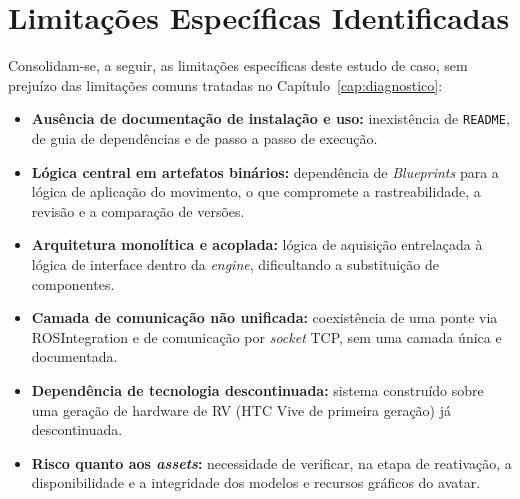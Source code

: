 \section{Limitações Específicas Identificadas}
\label{sec:vr-limitacoes}

Consolidam-se, a seguir, as limitações específicas deste estudo de caso, sem prejuízo das
limitações comuns tratadas no Capítulo~\ref{cap:diagnostico}:

\begin{itemize}
	\item \textbf{Ausência de documentação de instalação e uso:} inexistência de
	      \texttt{README}, de guia de dependências e de passo a passo de execução.
	\item \textbf{Lógica central em artefatos binários:} dependência de \emph{Blueprints}
	      para a lógica de aplicação do movimento, o que compromete a rastreabilidade, a
	      revisão e a comparação de versões.
	\item \textbf{Arquitetura monolítica e acoplada:} lógica de aquisição entrelaçada à
	      lógica de interface dentro da \emph{engine}, dificultando a substituição de
	      componentes.
	\item \textbf{Camada de comunicação não unificada:} coexistência de uma ponte via
	      ROSIntegration e de comunicação por \emph{socket} TCP, sem uma camada única e
	      documentada.
	\item \textbf{Dependência de tecnologia descontinuada:} sistema construído sobre uma
	      geração de hardware de RV (HTC Vive de primeira geração) já descontinuada.
	\item \textbf{Risco quanto aos \emph{assets}:} necessidade de verificar, na etapa de
	      reativação, a disponibilidade e a integridade dos modelos e recursos gráficos do
	      avatar.
\end{itemize}
